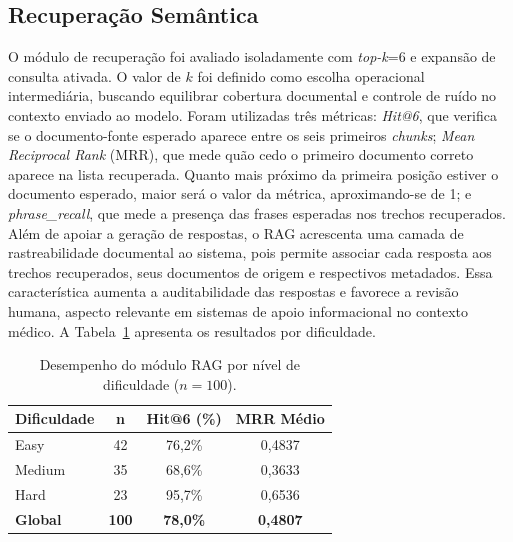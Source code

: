 \documentclass[12pt]{article}
\begin{document}

\subsection{Recuperação Semântica}

O módulo de recuperação foi avaliado isoladamente com \textit{top-k}=6 e expansão de consulta ativada.
O valor de $k$ foi definido como escolha operacional intermediária, buscando equilibrar cobertura documental e controle de ruído no contexto enviado ao modelo.
Foram utilizadas três métricas:
\textit{Hit@6}, que verifica se o documento-fonte esperado aparece entre os seis primeiros \textit{chunks};
\textit{Mean Reciprocal Rank} (MRR), que mede quão cedo o primeiro documento correto aparece na lista recuperada. Quanto mais próximo da primeira posição estiver o documento esperado, maior será o valor da métrica, aproximando-se de 1;
e \textit{phrase\_recall}, que mede a presença das frases esperadas nos trechos recuperados.
Além de apoiar a geração de respostas, o RAG acrescenta uma camada de rastreabilidade documental ao sistema, pois permite associar cada resposta aos trechos recuperados, seus documentos de origem e respectivos metadados.
Essa característica aumenta a auditabilidade das respostas e favorece a revisão humana, aspecto relevante em sistemas de apoio informacional no contexto médico.
A Tabela~\ref{tab:metricas_rag} apresenta os resultados por dificuldade.


\begin{table}[H]
  \centering
  \caption{Desempenho do módulo RAG por nível de dificuldade ($n=100$).}
  \label{tab:metricas_rag}
  \small
  \begin{tabular}{lccc}
  	\toprule
  	\textbf{Dificuldade} & \textbf{n}   & \textbf{Hit@6 (\%)}  & \textbf{MRR Médio} \\
  	\midrule
  	Easy                 & 42           & 76,2\%               & 0,4837             \\
  	Medium               & 35           & 68,6\%               & 0,3633             \\
  	Hard                 & 23           & 95,7\%               & 0,6536             \\
  	\midrule
  	\textbf{Global}      & \textbf{100} & \textbf{78,0\%}      & \textbf{0,4807}    \\
  	\bottomrule
  	\end{tabular}
  \end{table}
  
\end{document}
